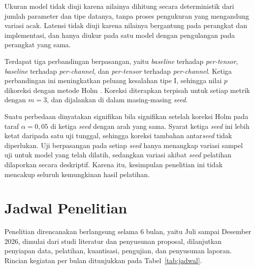 Ukuran model tidak diuji karena nilainya dihitung secara deterministik dari jumlah parameter dan tipe datanya, tanpa proses pengukuran yang mengandung variasi acak. Latensi tidak diuji karena nilainya bergantung pada perangkat dan implementasi, dan hanya diukur pada satu model dengan pengulangan pada perangkat yang sama.

Terdapat tiga perbandingan berpasangan, yaitu \textit{baseline} terhadap \textit{per-tensor}, \textit{baseline} terhadap \textit{per-channel}, dan \textit{per-tensor} terhadap \textit{per-channel}. Ketiga perbandingan ini meningkatkan peluang kesalahan tipe I, sehingga nilai $p$ dikoreksi dengan metode Holm \parencite{holm1979}. Koreksi diterapkan terpisah untuk setiap metrik dengan $m = 3$, dan dijalankan di dalam masing-masing \textit{seed}.

Suatu perbedaan dinyatakan signifikan bila signifikan setelah koreksi Holm pada taraf $\alpha = 0{,}05$ di ketiga \textit{seed} dengan arah yang sama. Syarat ketiga \textit{seed} ini lebih ketat daripada satu uji tunggal, sehingga koreksi tambahan antar\textit{seed} tidak diperlukan. Uji berpasangan pada setiap \textit{seed} hanya menangkap variasi sampel uji untuk model yang telah dilatih, sedangkan variasi akibat \textit{seed} pelatihan dilaporkan secara deskriptif. Karena itu, kesimpulan penelitian ini tidak mencakup seluruh kemungkinan hasil pelatihan.

\section{Jadwal Penelitian}

Penelitian direncanakan berlangsung selama 6 bulan, yaitu Juli sampai Desember 2026, dimulai dari studi literatur dan penyusunan proposal, dilanjutkan penyiapan data, pelatihan, kuantisasi, pengujian, dan penyusunan laporan. Rincian kegiatan per bulan ditunjukkan pada Tabel~\ref{tab:jadwal}.

